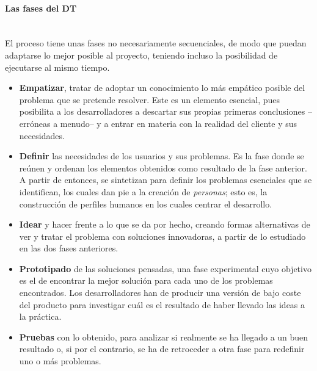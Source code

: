 \paragraph{Las fases del DT}
\leavevmode\\[\baselineskip]

El proceso tiene unas fases no necesariamente secuenciales, de modo que puedan adaptarse lo mejor posible al proyecto, teniendo incluso la posibilidad de ejecutarse al mismo tiempo.

\begin{itemize}
	\item \textbf{Empatizar}, tratar de adoptar un conocimiento lo más empático posible del problema que se pretende resolver. Este es un elemento esencial, pues posibilita a los desarrolladores a descartar sus propias primeras conclusiones --erróneas a menudo-- y a entrar en materia con la realidad del cliente y sus necesidades.
	
	\item \textbf{Definir} las necesidades de los usuarios y sus problemas. Es la fase donde se reúnen y ordenan los elementos obtenidos como resultado de la fase anterior. A partir de entonces, se sintetizan para definir los problemas esenciales que se identifican, los cuales dan pie a la creación de \textit{personas}; esto es, la construcción de perfiles humanos en los cuales centrar el desarrollo.
	
	\item \textbf{Idear} y hacer frente a lo que se da por hecho, creando formas alternativas de ver y tratar el problema con soluciones innovadoras, a partir de lo estudiado en las dos fases anteriores.
	
	\item \textbf{Prototipado} de las soluciones pensadas, una fase experimental cuyo objetivo es el de encontrar la mejor solución para cada uno de los problemas encontrados. Los desarrolladores han de producir una versión de bajo coste del producto para investigar cuál es el resultado de haber llevado las ideas a la práctica.
	
	\item \textbf{Pruebas} con lo obtenido, para analizar si realmente se ha llegado a un buen resultado o, si por el contrario, se ha de retroceder a otra fase para redefinir uno o más problemas.
	
\end{itemize}

